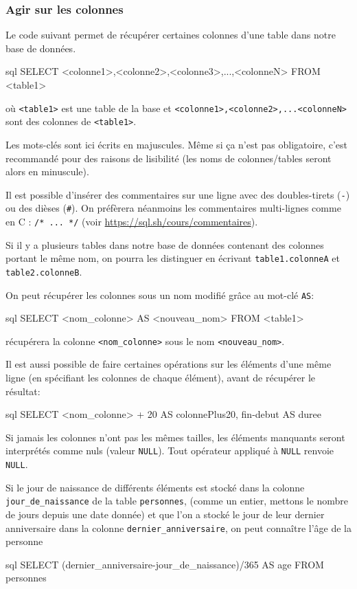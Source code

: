 \documentclass[a4paper]{scrartcl}
\begin{document}
			\subsubsection{Agir sur les colonnes}
				\semidef Le code suivant permet de récupérer certaines colonnes d'une table dans notre base de données.
				\begin{code}{sql}
					SELECT <colonne1>,<colonne2>,<colonne3>,...,<colonneN>
					FROM <table1>
				\end{code}
				où \texttt{<table1>} est une table de la base et \texttt{<colonne1>,<colonne2>,...<colonneN>} sont des colonnes de \texttt{<table1>}.

				\rem Les mots-clés sont ici écrits en majuscules. Même si ça n'est pas obligatoire, c'est recommandé pour des raisons de lisibilité
				(les noms de colonnes/tables seront alors en minuscule).

				\rem Il est possible d'insérer des commentaires sur une ligne avec des doubles-tirets (\texttt{-\-}) ou des dièses (\texttt{\#}).
					On préfèrera néanmoins les commentaires multi-lignes comme en C : \texttt{/* ... */} (voir \url{https://sql.sh/cours/commentaires}).
				
				\rem Si il y a plusieurs tables dans notre base de données contenant des colonnes portant le même nom,
				on pourra les distinguer en écrivant \texttt{table1.colonneA} et \texttt{table2.colonneB}.
				
				\semidef On peut récupérer les colonnes sous un nom modifié grâce au mot-clé \texttt{AS}:
				\begin{code}{sql} 
					SELECT <nom_colonne> AS <nouveau_nom>
					FROM <table1>
				\end{code}
				récupérera la colonne \texttt{<nom\_colonne>} sous le nom \texttt{<nouveau\_nom>}.

				Il est aussi possible de faire certaines opérations sur les éléments d'une même ligne (en spécifiant les colonnes de chaque élément), avant de récupérer le résultat:
				\begin{code}{sql}
					SELECT <nom_colonne> + 20 AS colonnePlus20, fin-debut AS duree
				\end{code}

				\rem Si jamais les colonnes n'ont pas les mêmes tailles, les éléments manquants seront interprétés comme nuls (valeur \texttt{NULL}).
				Tout opérateur appliqué à \texttt{NULL} renvoie \texttt{NULL}.

				\exemple Si le jour de naissance de différents éléments est stocké dans la colonne \texttt{jour\_de\_naissance} de la table \texttt{personnes},
				(comme un entier, mettons le nombre de jours depuis une date donnée)
				et que l'on a stocké le jour de leur dernier anniversaire dans la colonne \texttt{dernier\_anniversaire},
				on peut connaître l'âge de la personne
				\begin{code}{sql}
					SELECT (dernier_anniversaire-jour_de_naissance)/365 AS age
					FROM personnes 
				\end{code}
\end{document}

